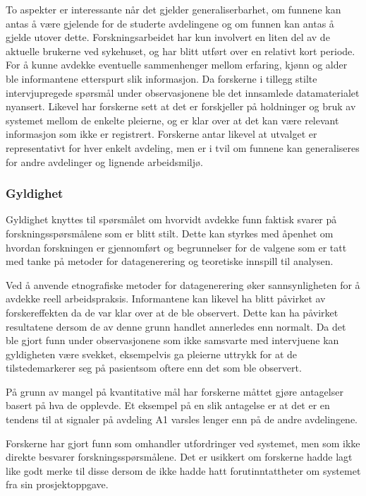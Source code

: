 \noindent
To aspekter er interessante når det gjelder generaliserbarhet, om funnene kan antas å være gjelende for de studerte avdelingene og om funnen kan antas å gjelde utover dette.  Forskningsarbeidet har kun involvert en liten del av de aktuelle brukerne ved sykehuset, og har blitt utført over en relativt kort periode. For å kunne avdekke eventuelle sammenhenger mellom erfaring, kjønn og alder ble informantene etterspurt slik informasjon. Da forskerne i tillegg stilte intervjupregede spørsmål under observasjonene ble det innsamlede datamaterialet nyansert. Likevel har forskerne sett at det er forskjeller på holdninger og bruk av systemet mellom de enkelte pleierne, og er klar over at det kan være relevant informasjon som ikke er registrert. Forskerne antar likevel at utvalget er representativt for hver enkelt avdeling, men er i tvil om funnene kan generaliseres for andre avdelinger og lignende arbeidsmiljø. 

\subsubsection{Gyldighet}
Gyldighet knyttes til spørsmålet om hvorvidt avdekke funn faktisk svarer på forskningsspørsmålene som er blitt stilt. Dette kan styrkes med åpenhet om hvordan forskningen er gjennomført og begrunnelser for de valgene som er tatt med tanke på metoder for datagenerering og teoretiske innspill til analysen. 

\noindent
Ved å anvende etnografiske metoder for datagenerering øker sannsynligheten for å avdekke reell arbeidspraksis. Informantene kan likevel ha blitt påvirket av forskereffekten da de var klar over at de ble observert. Dette kan ha påvirket resultatene dersom de av denne grunn handlet annerledes enn normalt. Da det ble gjort funn under observasjonene som ikke samsvarte med intervjuene kan gyldigheten være svekket, eksempelvis ga pleierne uttrykk for at de tilstedemarkerer seg på pasientsom oftere enn det som ble observert.

\noindent
På grunn av mangel på kvantitative mål har forskerne måttet gjøre antagelser basert på hva de opplevde. Et eksempel på en slik antagelse er at det er en tendens til at signaler på avdeling A1 varsles lenger enn på de andre avdelingene.

\noindent	
Forskerne har gjort funn som omhandler utfordringer ved systemet, men som ikke direkte besvarer forskningsspørsmålene. Det er usikkert om forskerne hadde lagt like godt merke til disse dersom de ikke hadde hatt forutinntattheter om systemet fra sin prosjektoppgave.